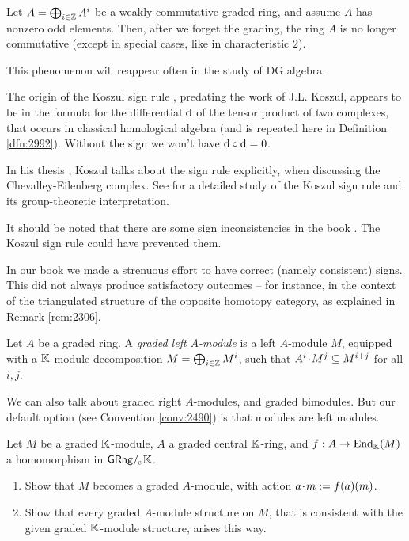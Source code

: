 \begin{rem} \label{rem:2992}
Let $A = \bigoplus_{i \in \mathbb{Z}} A^i$ be a weakly commutative graded ring, and 
assume $A$ has nonzero odd elements. Then, after we forget the grading, the 
ring $A$ is no longer commutative (except in special cases, like in 
characteristic $2$). 

This phenomenon will reappear often in the study of DG algebra.
\end{rem}

\begin{rem} \label{rem:2991}
The origin of the Koszul sign rule%
,
predating the work of J.L. Koszul, 
appears to be in the formula for the differential $\mathrm{d}$ of the tensor product of 
two complexes, that occurs in classical homological algebra (and is repeated 
here in Definition \ref{dfn:2992}). Without the sign we won't have 
$\mathrm{d} \circ \mathrm{d} = 0$. 

In his thesis \cite{Kosz2}, Koszul talks about the sign rule explicitly,
when discussing the Chevalley-Eilenberg complex. 
See \cite{Berger} for a detailed study of the Koszul sign rule and its 
group-theoretic interpretation.  

It should be noted that there are some sign inconsistencies in the book 
\cite{RD}. The Koszul sign rule could have prevented them. 

In our book we made a strenuous effort to have correct (namely consistent) 
signs. This did not always produce satisfactory outcomes -- for instance, in 
the context of the triangulated structure of the opposite homotopy category, as 
explained in Remark \ref{rem:2306}. 
\end{rem}

\begin{dfn} \label{dfn:4127}
Let $A$ be a graded ring. A 
{\em graded left $A$-module}%
is a left $A$-module $M$, equipped with a $\mathbb{K}$-module decomposition 
$M =  \bigoplus_{i \in \mathbb{Z}} M^i$, such that 
$A^i \mspace{1.5mu}{\cdot}\mspace{1.5mu} M^j \subseteq M^{i + j}$ for all $i, j$. 
\end{dfn}

We can also talk about graded right $A$-modules, and graded bimodules. 
But our default option (see Convention \ref{conv:2490}) is that modules are 
left modules.

\begin{exer} \label{exer:4110}
Let $M$ be a graded $\mathbb{K}$-module, $A$ a graded central $\mathbb{K}$-ring, and
$f : A \to \operatorname{End}_{\mathbb{K}}(M)$ a homomorphism in $\mathrm{\mathsf{GRng}} /_{\mspace{-2mu} \mathrm{c}} \mspace{2mu} \mathbb{K}$.
\begin{enumerate}
\item Show that $M$ becomes a graded $A$-module, with action  
$a \mspace{1.5mu}{\cdot}\mspace{1.5mu} m := f(a)(m)$.

\item Show that every graded $A$-module structure on $M$, that is consistent 
with the given graded $\mathbb{K}$-module structure, arises this way. 
\end{enumerate}  
\end{exer}

